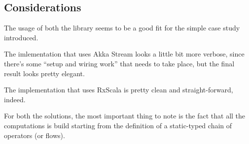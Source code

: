 \subsection{Considerations}\label{considerations}

The usage of both the library seems to be a good fit for the simple case
study introduced.

The imlementation that uses Akka Stream looks a little bit more verbose,
since there's some ``setup and wiring work'' that needs to take place,
but the final result looks pretty elegant.

The implementation that uses RxScala is pretty clean and
straight-forward, indeed.

For both the solutions, the most important thing to note is the fact
that all the computations is build starting from the definition of a
static-typed chain of operators (or flows).

